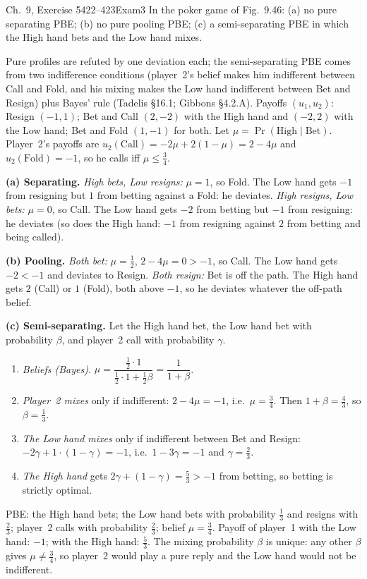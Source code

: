\begin{exsol}{\MG{} Ch.~9, Exercise 5}{422--423}{Exam}{3}
\asked In the poker game of Fig.~9.46: (a) no pure separating PBE; (b) no pure pooling PBE;
(c) a semi-separating PBE in which the High hand bets and the Low hand mixes.

\method Pure profiles are refuted by one deviation each; the semi-separating PBE comes from two
indifference conditions (player~2's belief makes him indifferent between Call and Fold, and his
mixing makes the Low hand indifferent between Bet and Resign) plus Bayes' rule (Tadelis \S16.1;
Gibbons \S4.2.A). Payoffs $(u_1, u_2)$: Resign $(-1, 1)$; Bet and Call $(2, -2)$ with the High
hand and $(-2, 2)$ with the Low hand; Bet and Fold $(1, -1)$ for both. Let $\mu = \Pr(\text{High}
\mid \text{Bet})$. Player~2's payoffs are $u_2(\text{Call}) = -2\mu + 2(1 - \mu) = 2 - 4\mu$ and
$u_2(\text{Fold}) = -1$, so he calls iff $\mu \le \frac34$.

\solution \textbf{(a) Separating.} \emph{High bets, Low resigns:} $\mu = 1$, so Fold. The Low hand
gets $-1$ from resigning but $1$ from betting against a Fold: he deviates. \emph{High resigns,
Low bets:} $\mu = 0$, so Call. The Low hand gets $-2$ from betting but $-1$ from resigning: he
deviates (so does the High hand: $-1$ from resigning against $2$ from betting and being called).

\textbf{(b) Pooling.} \emph{Both bet:} $\mu = \frac12$, $2 - 4\mu = 0 > -1$, so Call. The Low hand
gets $-2 < -1$ and deviates to Resign. \emph{Both resign:} Bet is off the path. The High hand
gets $2$ (Call) or $1$ (Fold), both above $-1$, so he deviates whatever the off-path belief.

\textbf{(c) Semi-separating.} Let the High hand bet, the Low hand bet with probability $\beta$, and
player~2 call with probability $\gamma$.
\begin{enumerate}[label=(\roman*)]
  \item \emph{Beliefs (Bayes).} $\mu = \dfrac{\frac12 \cdot 1}{\frac12 \cdot 1 + \frac12 \beta} = \dfrac{1}{1 + \beta}$.
  \item \emph{Player~2 mixes} only if indifferent: $2 - 4\mu = -1$, i.e.\ $\mu = \frac34$. Then
  $1 + \beta = \frac43$, so $\beta = \frac13$.
  \item \emph{The Low hand mixes} only if indifferent between Bet and Resign:
  $-2\gamma + 1\cdot(1-\gamma) = -1$, i.e.\ $1 - 3\gamma = -1$ and $\gamma = \frac23$.
  \item \emph{The High hand} gets $2\gamma + (1 - \gamma) = \frac53 > -1$ from betting, so
  betting is strictly optimal.
\end{enumerate}
PBE: the High hand bets; the Low hand bets with probability $\frac13$ and resigns with $\frac23$;
player~2 calls with probability $\frac23$; belief $\mu = \frac34$. Payoff of player~1 with the Low
hand: $-1$; with the High hand: $\frac53$. The mixing probability $\beta$ is unique: any other
$\beta$ gives $\mu \ne \frac34$, so player~2 would play a pure reply and the Low hand would not be
indifferent.


\end{exsol}

